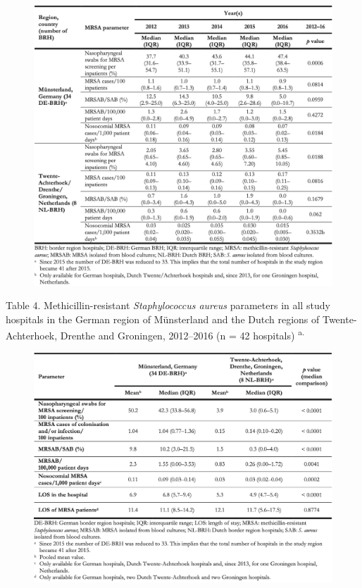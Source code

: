 \documentclass[
]{book}
\begin{document}
\begin{figure}

{\centering \includegraphics[width=1\linewidth]{images/09-t03} 

}

\end{figure}

Table 4. Methicillin-resistant \emph{Staphylococcus aureus} parameters in all study hospitals in the German region of Münsterland and the Dutch regions of Twente-Achterhoek, Drenthe and Groningen, 2012--2016 (n = 42 hospitals) \textsuperscript{a.}

\begin{figure}

{\centering \includegraphics[width=1\linewidth]{images/09-t04} 

}

\end{figure}
\end{document}
